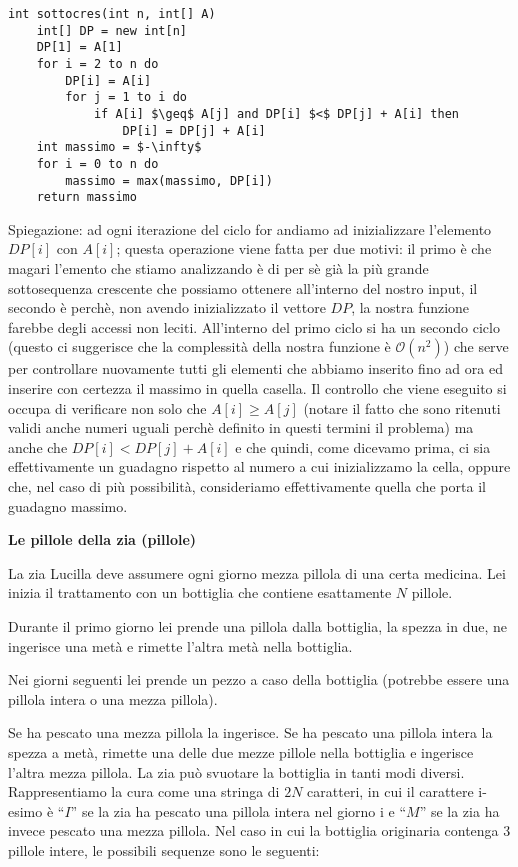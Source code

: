 \documentclass[../cheatSheetAlgoritmi.tex]{subfiles}
\begin{document}
\begin{lstlisting}[caption=Sottoinsieme Crescente di Somma Massima]
int sottocres(int n, int[] A)
	int[] DP = new int[n]
	DP[1] = A[1]
	for i = 2 to n do
		DP[i] = A[i]
		for j = 1 to i do
			if A[i] $\geq$ A[j] and DP[i] $<$ DP[j] + A[i] then
				DP[i] = DP[j] + A[i]
	int massimo = $-\infty$
	for i = 0 to n do
		massimo = max(massimo, DP[i])
	return massimo
\end{lstlisting} 
Spiegazione: ad ogni iterazione del ciclo for andiamo ad inizializzare l'elemento $DP[i]$ con $A[i]$; questa operazione viene fatta per due motivi: il primo è che magari l'emento che stiamo analizzando è di per sè già la più grande sottosequenza crescente che possiamo ottenere all'interno del nostro input, il secondo è perchè, non avendo inizializzato il vettore $DP$, la nostra funzione farebbe degli accessi non leciti. All'interno del primo ciclo si ha un secondo ciclo (questo ci suggerisce che la complessità della nostra funzione è $\mathcal{O}(n^{2})$) che serve per controllare nuovamente tutti gli elementi che abbiamo inserito fino ad ora ed inserire con certezza il massimo in quella casella. Il controllo che viene eseguito si occupa di verificare non solo che $A[i] \geq A[j]$ (notare il fatto che sono ritenuti validi anche numeri uguali perchè definito in questi termini il problema) ma anche che $DP[i] < DP[j] + A[i]$ e che quindi, come dicevamo prima, ci sia effettivamente un guadagno rispetto al numero a cui inizializzamo la cella, oppure che, nel caso di più possibilità, consideriamo effettivamente quella che porta il guadagno massimo.

\bigskip

\textbf{Le pillole della zia (pillole)}

La zia Lucilla deve assumere ogni giorno mezza pillola di una certa medicina. Lei inizia il trattamento con un bottiglia che contiene esattamente $N$ pillole.

\bigskip

Durante il primo giorno lei prende una pillola dalla bottiglia, la spezza in due, ne ingerisce una metà e rimette l'altra metà nella bottiglia.

Nei giorni seguenti lei prende un pezzo a caso della bottiglia (potrebbe essere una pillola intera o una mezza pillola).

Se ha pescato una mezza pillola la ingerisce. Se ha pescato una pillola intera la spezza a metà, rimette una delle due mezze pillole nella bottiglia e ingerisce l’altra mezza pillola.
La zia può svuotare la bottiglia in tanti modi diversi. Rappresentiamo la cura come una stringa di $2N$ caratteri, in cui il carattere i-esimo è “$I$” se la zia ha pescato una pillola intera nel giorno i e “$M$” se la zia ha invece pescato una mezza pillola. Nel caso in cui la bottiglia originaria contenga 3 pillole intere, le possibili sequenze sono le seguenti:
\end{document}
